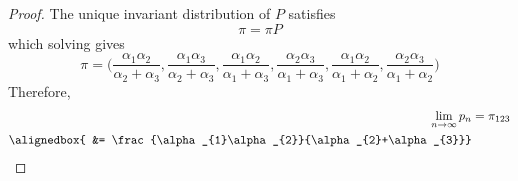 \documentclass[
  coursecode={MTHE 455},
  assignmentname={Assignment \assignmentnumber},
  studentnumber=20053722,
  name={Bryan Hoang},
  draft,
]{
  ltxanswer%
}
\begin{document}
\begin{questions}
\begin{solution}
\begin{proof}
        The unique invariant distribution of \(P\) satisfies
        \begin{equation*}
          \pi = \pi P
        \end{equation*}
        which solving gives
        \begin{equation*}
          \pi = \biggl(\frac{\alpha_{1}\alpha_{2}}{\alpha_{2}+\alpha_{3}},\frac{\alpha_{1}\alpha_{3}}{\alpha_{2}+\alpha_{3}},\frac{\alpha_{1}\alpha_{2}}{\alpha_{1}+\alpha_{3}},\frac{\alpha_{2}\alpha_{3}}{\alpha_{1}+\alpha_{3}},\frac{\alpha_{1}\alpha_{2}}{\alpha_{1}+\alpha_{2}},\frac{\alpha_{2}\alpha_{3}}{\alpha_{1}+\alpha_{2}}\biggr)
        \end{equation*}
        Therefore,
        \begin{align*}
          \lim_{n \to \infty} p_{n} &= \pi_{123}                                           \\
          \alignedbox{              &= \frac{\alpha_{1}\alpha_{2}}{\alpha_{2}+\alpha_{3}}}
        \end{align*}
      \end{proof}
    \end{solution}
  \end{questions}
\end{document}
